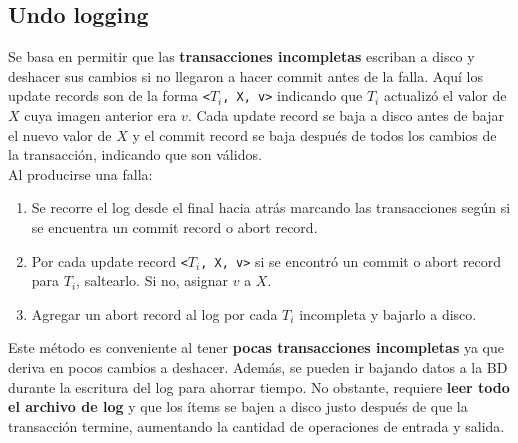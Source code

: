 \subsection*{Undo logging}
Se basa en permitir que las \textbf{transacciones incompletas} escriban a disco y deshacer sus cambios si no llegaron a hacer commit antes de la falla. Aquí los update records son de la forma \texttt{<$T_i$, X, v>} indicando que $T_i$ actualizó el valor de $X$ cuya imagen anterior era $v$. Cada update record se baja a disco antes de bajar el nuevo valor de $X$ y el commit record se baja después de todos los cambios de la transacción, indicando que son válidos. \\
Al producirse una falla:
\begin{enumerate}
    \item Se recorre el log desde el final hacia atrás marcando las transacciones según si se encuentra un commit record o abort record.
    \item Por cada update record \texttt{<$T_i$, X, v>} si se encontró un commit o abort record para $T_i$, saltearlo. Si no, asignar $v$ a $X$.
    \item Agregar un abort record al log por cada $T_i$ incompleta y bajarlo a disco.
\end{enumerate}
Este método es conveniente al tener \textbf{pocas transacciones incompletas} ya que deriva en pocos cambios a deshacer. Además, se pueden ir bajando datos a la BD durante la escritura del log para ahorrar tiempo. No obstante, requiere \textbf{leer todo el archivo de log} y que los ítems se bajen a disco justo después de que la transacción termine, aumentando la cantidad de operaciones de entrada y salida.

